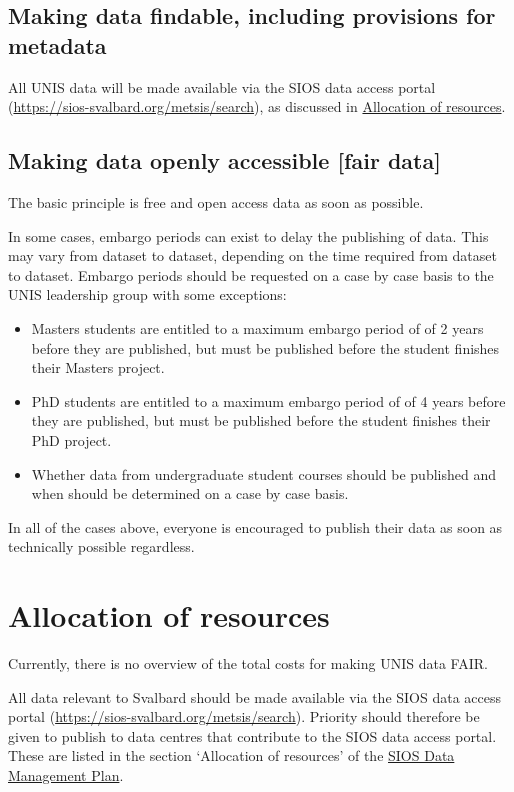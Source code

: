 \documentclass[a4paper,english, 11pt]{article}
\begin{document}
\subsection{Making data findable, including provisions for metadata}
\label{ss:findable}

All UNIS data will be made available via the SIOS data access portal (\url{https://sios-svalbard.org/metsis/search}), as discussed in \href{s:resources}{Allocation of resources}. 

\subsection{Making data openly accessible [fair data]}
\label{ss:accessible}

The basic principle is free and open access data as soon as possible. 

In some cases, embargo periods can exist to delay the publishing of data. This may vary from dataset to dataset, depending on the time required from dataset to dataset. Embargo periods should be requested on a case by case basis to the UNIS leadership group with some exceptions:

 \begin{itemize}
 \item Masters students are entitled to a maximum embargo period of of 2 years before they are published, but must be published before the student finishes their Masters project. 
 \item PhD students are entitled to a maximum embargo period of of 4 years before they are published, but must be published before the student finishes their PhD project.
 \item Whether data from undergraduate student courses should be published and when should be determined on a case by case basis. 
 \end{itemize}

In all of the cases above, everyone is encouraged to publish their data as soon as technically possible regardless.

\section{Allocation of resources}
\label{s:resources}

Currently, there is no overview of the total costs for making UNIS data FAIR. 

All data relevant to Svalbard should be made available via the SIOS data access portal (\url{https://sios-svalbard.org/metsis/search}). Priority should therefore be given to publish to data centres that contribute to the SIOS data access portal. These are listed in the section `Allocation of resources' of the \href{https://sios-svalbard.org/sites/sios-svalbard.org/files/common/SIOS_Data_Management_Plan.pdf}{SIOS Data Management Plan}.
\end{document}
